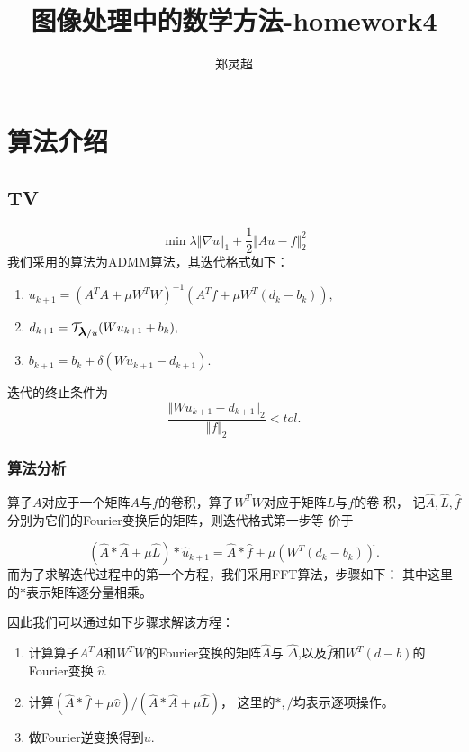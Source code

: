 \documentclass[a4paper,  11pt]{ctexart}
\newcommand{\bm}[1]{\mbox{\boldmath{$#1$}}}
\begin{document}
\title{图像处理中的数学方法-homework4}
\author{郑灵超}
\maketitle

\section{算法介绍}
\subsection{TV}
\[  
   \min \lambda \Vert\nabla u\Vert_1 + \frac 12 \Vert
   Au - f \Vert_2^2
\]
我们采用的算法为ADMM算法，其迭代格式如下：
\begin{enumerate}
    \item $u_{k+1}=(A^TA+\mu W^TW)^{-1}(A^Tf+\mu W^T(d_k-b_k)),$
    \item $d_{k+1}=\mathcal{T}_{\bm\lambda/u}(Wu_{k+1}+b_k),$
    \item $b_{k+1}=b_k+\delta(Wu_{k+1}-d_{k+1}).$
\end{enumerate}
迭代的终止条件为
\[
\frac{\Vert Wu_{k+1}-d_{k+1}\Vert_2 }{\Vert f\Vert_2}<tol.
\]
\subsubsection*{算法分析}

算子$A$对应于一个矩阵$A$与$f$的卷积，算子$W^TW$对应于矩阵$L$与$f$的卷
积，
记$\hat{A},\hat{L},\hat{f}$分别为它们的Fourier变换后的矩阵，则迭代格式第一步等
价于

\[
    (\hat{A}*\hat{A}+\mu\hat{L})*\hat{u}_{k+1}=\hat{A}*\hat{f}+\mu
    (W^T(d_k-b_k))^{\hat{} }.
\]
而为了求解迭代过程中的第一个方程，我们采用FFT算法，步骤如下：
其中这里的$*$表示矩阵逐分量相乘。\par
因此我们可以通过如下步骤求解该方程：
\begin{enumerate}
    \item 计算算子$A^TA$和$W^TW$的Fourier变换的矩阵$\hat{A}$与
        $\hat{\Delta}$,以及$\hat{f}$和$W^T(d-b)$的Fourier变换
        $\hat{v}$.
    \item 计算$
        (\hat{A}*\hat{f}+\mu\hat{v})/(\hat{A}*\hat{A}+\mu\hat{L})$，
        这里的$*,/$均表示逐项操作。
    \item 做Fourier逆变换得到$u$.
\end{enumerate}
\end{document}
